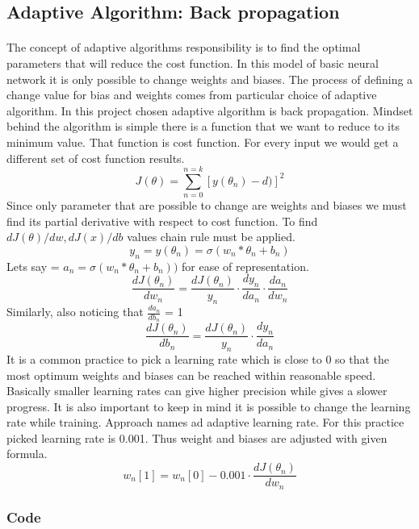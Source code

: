 \documentclass{article}
\begin{document}
\subsection{Adaptive Algorithm: Back propagation}
\paragraph{}
The concept of adaptive algorithms responsibility is to find the optimal parameters that will reduce the cost function. In this model of basic neural network it is only possible to change weights and biases. The process of defining a change value for bias and weights comes from particular choice of adaptive algorithm. In this project chosen adaptive algorithm is back propagation.  Mindset behind the algorithm is simple there is a function that we want to reduce to its minimum value. That function is cost function. For every input we would get a different set of cost function results. 
\[ J(\theta) = \sum_{n=0}^{n=k}[y(\theta_n) -d)]^2 \]
Since only parameter that are possible to change are weights and biases we must find its partial derivative with respect to cost function. To find \( dJ(\theta)/dw,  dJ(x)/db\) values chain rule must be applied. 
\[  y_n=y(\theta_n)  = \sigma(w_n*\theta_n + b_n) \]
Lets say = \(a_n = \sigma(w_n*\theta_n + b_n))\)  for ease of representation.
\[  \frac{dJ(\theta_n)}{dw_n} =  \frac{dJ(\theta_n)}{y_n} \cdot \frac{dy_n}{da_n} \cdot  \frac{da_n}{dw_n} \]
Similarly, also noticing that  \( \frac{da_n}{db_n} \) = 1
\[  \frac{dJ(\theta_n)}{db_n} =  \frac{dJ(\theta_n)}{y_n} \cdot \frac{dy_n}{da_n} \]
It is a common practice to pick a learning rate which is close to 0 so that the most optimum weights and biases can be reached within reasonable speed. Basically smaller learning rates can give higher precision while gives a slower progress. It is also important to keep in mind it is possible to change the learning rate while training. Approach names ad adaptive learning rate. For this practice picked learning rate is 0.001. Thus weight and biases are adjusted with given formula.
\[  w_n[1] =  w_n[0] - 0.001 \cdot \frac{dJ(\theta_n)}{dw_n}\]
\subsubsection{Code}
\end{document}
